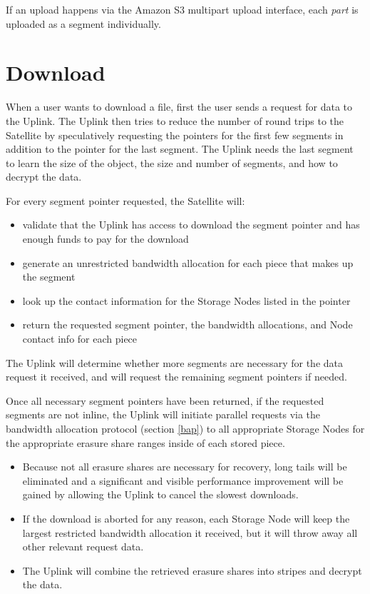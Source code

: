 \documentclass[8pt,fleqn,openany]{book}
\begin{document}
If an upload happens via the Amazon S3 multipart upload interface, each
{\em part} is uploaded as a segment individually.

\section{Download}

When a user wants to download a file, first the user sends a request for
data to the Uplink.
  The Uplink then tries to reduce the number of round trips to the Satellite
  by speculatively requesting the pointers for the first few segments in
  addition to the pointer for the last segment. The Uplink needs the last
  segment to learn the size of the object, the size and number of segments,
  and how to decrypt the data.

For every segment pointer requested, the Satellite will:
  \begin{itemize}
  \item validate that the Uplink has access to download the segment pointer
    and has enough funds to pay for the download
  \item generate an unrestricted bandwidth allocation for each piece that
    makes up the segment
  \item look up the contact information for the Storage Nodes listed in the
  pointer
  \item return the requested segment pointer, the bandwidth allocations, and
    Node contact info for each piece
  \end{itemize}

The Uplink will determine whether more segments are necessary for the
  data request it received, and will request the remaining segment pointers if needed.

Once all necessary segment pointers have been returned, if the requested
  segments are not inline, the Uplink will initiate parallel requests
  via the bandwidth allocation protocol (section \ref{bap}) to all appropriate Storage
  Nodes for the appropriate erasure share ranges inside of each stored piece.

\begin{itemize}
\item Because not all erasure shares are necessary for recovery, long tails
  will be eliminated and a significant and visible performance improvement will
  be gained by allowing the Uplink to cancel the slowest downloads.
\item If the download is aborted for any reason, each Storage Node will keep the
  largest restricted bandwidth allocation it received, but it will throw away all
  other relevant request data.
\item The Uplink will combine the retrieved erasure shares into stripes and
  decrypt the data.
\end{itemize}
\end{document}
